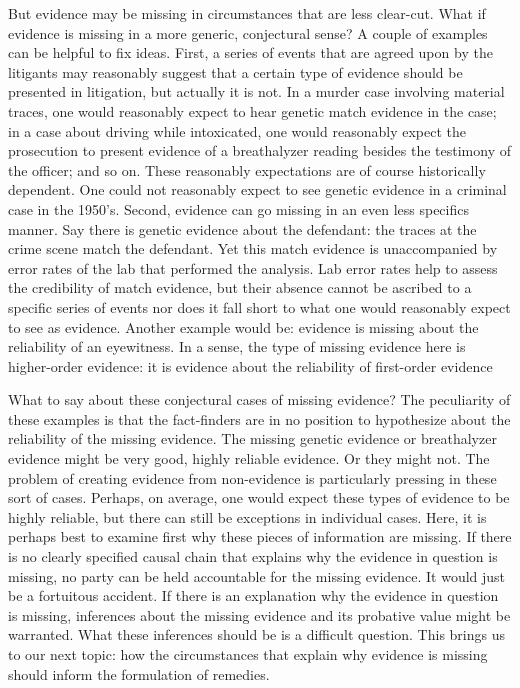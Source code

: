 \documentclass[
  10pt,
  dvipsnames,enabledeprecatedfontcommands]{scrartcl}
\begin{document}
But evidence may be missing in circumstances that are less clear-cut.
What if evidence is missing in a more generic, conjectural sense? A
couple of examples can be helpful to fix ideas. First, a series of
events that are agreed upon by the litigants may reasonably suggest that
a certain type of evidence should be presented in litigation, but
actually it is not. In a murder case involving material traces, one
would reasonably expect to hear genetic match evidence in the case; in a
case about driving while intoxicated, one would reasonably expect the
prosecution to present evidence of a breathalyzer reading besides the
testimony of the officer; and so on. These reasonably expectations are
of course historically dependent. One could not reasonably expect to see
genetic evidence in a criminal case in the 1950's. Second, evidence can
go missing in an even less specifics manner. Say there is genetic
evidence about the defendant: the traces at the crime scene match the
defendant. Yet this match evidence is unaccompanied by error rates of
the lab that performed the analysis. Lab error rates help to assess the
credibility of match evidence, but their absence cannot be ascribed to a
specific series of events nor does it fall short to what one would
reasonably expect to see as evidence. Another example would be: evidence
is missing about the reliability of an eyewitness. In a sense, the type
of missing evidence here is higher-order evidence: it is evidence about
the reliability of first-order evidence

What to say about these conjectural cases of missing evidence? The
peculiarity of these examples is that the fact-finders are in no
position to hypothesize about the reliability of the missing evidence.
The missing genetic evidence or breathalyzer evidence might be very
good, highly reliable evidence. Or they might not. The problem of
creating evidence from non-evidence is particularly pressing in these
sort of cases. Perhaps, on average, one would expect these types of
evidence to be highly reliable, but there can still be exceptions in
individual cases. Here, it is perhaps best to examine first why these
pieces of information are missing. If there is no clearly specified
causal chain that explains why the evidence in question is missing, no
party can be held accountable for the missing evidence. It would just be
a fortuitous accident. If there is an explanation why the evidence in
question is missing, inferences about the missing evidence and its
probative value might be warranted. What these inferences should be is a
difficult question. This brings us to our next topic: how the
circumstances that explain why evidence is missing should inform the
formulation of remedies.
\end{document}
